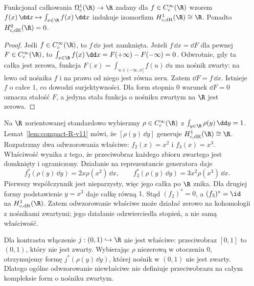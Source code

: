\begin{lemat}
\label{lem:compact-R-v11}
Funkcjonał całkowania
$\Omega_c^1(\R)\to\R$ zadany dla
$f\in C_c^\infty(\R)$ wzorem
$f(x)\,\dd x\mapsto\int_{x\in\R}f(x)\,\dd x$
indukuje izomorfizm $H_{c,\mathrm{dR}}^1(\R)\cong\R$.
Ponadto $H_{c,\mathrm{dR}}^0(\R)=0$.
\end{lemat}
\begin{proof}
Jeśli $f\in C_c^\infty(\R)$, to $f\,\dd x$ jest zamknięta.
Jeżeli $f\,\dd x=\dd F$ dla pewnej
$F\in C_c^\infty(\R)$, to
$\int_{x\in\R}f(x)\,\dd x=F(+\infty)-F(-\infty)=0$.
Odwrotnie, gdy ta całka jest zerowa, funkcja
$F(x)=\int_{u\in(-\infty,x]} f(u)\,\dd u$ ma nośnik
zwarty: na lewo od nośnika $f$ i na prawo od niego
jest równa zeru. Zatem $\dd F=f\,\dd x$.
Istnieje $f$ o całce $1$, co dowodzi surjektywności.
Dla form stopnia $0$ warunek $\dd F=0$ oznacza
stałość $F$, a jedyna stała funkcja o nośniku zwartym
na $\R$ jest zerowa.
\end{proof}

\begin{przyklad}
\label{prz:compact-proper-degree-22}
Na $\R$ zorientowanej standardowo wybierzmy
$\rho\in C_c^\infty(\R)$ z
$\int_{y\in\R}\rho(y)\,\dd y=1$.
Lemat~\ref{lem:compact-R-v11} mówi, że
$[\rho(y)\,\dd y]$ generuje
$H_{c,\mathrm{dR}}^1(\R)\cong\R$.
Rozpatrzmy dwa odwzorowania właściwe:
$f_2(x)=x^2$ i $f_3(x)=x^3$.
Właściwość wynika z tego, że przeciwobraz
każdego zbioru zwartego jest domknięty i ograniczony.
Działanie na reprezentancie generatora daje
\[
 f_2^*(\rho(y)\,\dd y)=2x\rho(x^2)\,\dd x,
 \qquad
 f_3^*(\rho(y)\,\dd y)=3x^2\rho(x^3)\,\dd x.
\]
Pierwszy współczynnik jest nieparzysty,
więc jego całka po $\R$ znika. Dla drugiej
formy podstawienie $y=x^3$ daje całkę równą $1$.
Stąd $(f_2)^*=0$, a $(f_3)^*=\id$ na
$H_{c,\mathrm{dR}}^1(\R)$. Zatem odwzorowanie
właściwe może działać zerowo na kohomologii
z nośnikami zwartymi; jego działanie odzwierciedla
stopień, a nie samą właściwość.

Dla kontrastu włączenie
$j:(0,1)\hookrightarrow\R$ nie jest właściwe:
przeciwobraz $[0,1]$ to $(0,1)$, który nie jest
zwarty. Wybierając $\rho$ niezerową w otoczeniu
$0$, otrzymujemy formę $j^*(\rho(y)\,\dd y)$,
której nośnik w $(0,1)$ nie jest zwarty.
Dlatego ogólne odwzorowanie niewłaściwe nie definiuje
przeciwobrazu na całym kompleksie form o nośniku zwartym.
\end{przyklad}

